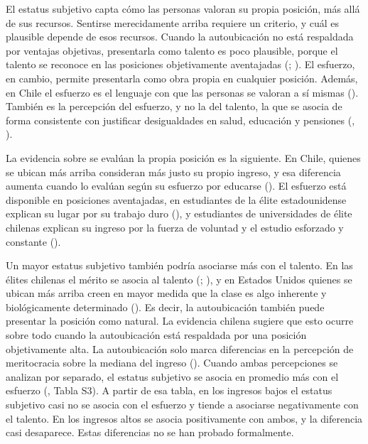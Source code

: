 \documentclass[
  spanish,
  a4paper,
  oneside]{scrbook}
\begin{document}
El estatus subjetivo capta cómo las personas valoran su propia posición,
más allá de sus recursos. Sentirse merecidamente arriba requiere un
criterio, y cuál es plausible depende de esos recursos. Cuando la
autoubicación no está respaldada por ventajas objetivas, presentarla
como talento es poco plausible, porque el talento se reconoce en las
posiciones objetivamente aventajadas
(;
).
El esfuerzo, en cambio, permite presentarla como obra propia en
cualquier posición. Además, en Chile el esfuerzo es el lenguaje con que
las personas se valoran a sí mismas
(). También es la percepción del esfuerzo, y no la del
talento, la que se asocia de forma consistente con justificar
desigualdades en salud, educación y pensiones
(,
).

La evidencia sobre se evalúan la propia posición es la siguiente. En
Chile, quienes se ubican más arriba consideran más justo su propio
ingreso, y esa diferencia aumenta cuando lo evalúan según su esfuerzo
por educarse (). El esfuerzo está disponible en posiciones
aventajadas, en estudiantes de la élite estadounidense explican su lugar
por su trabajo duro (), y estudiantes de universidades de élite chilenas explican
su ingreso por la fuerza de voluntad y el estudio esforzado y constante
().

Un mayor estatus subjetivo también podría asociarse más con el talento.
En las élites chilenas el mérito se asocia al talento
(; ), y en Estados Unidos quienes se ubican más arriba creen
en mayor medida que la clase es algo inherente y biológicamente
determinado (). Es decir, la autoubicación también puede presentar la
posición como natural. La evidencia chilena sugiere que esto ocurre
sobre todo cuando la autoubicación está respaldada por una posición
objetivamente alta. La autoubicación solo marca diferencias en la
percepción de meritocracia sobre la mediana del ingreso
(). Cuando ambas percepciones se analizan por separado, el
estatus subjetivo se asocia en promedio más con el esfuerzo
(, Tabla S3). A partir de esa tabla, en los ingresos bajos el
estatus subjetivo casi no se asocia con el esfuerzo y tiende a asociarse
negativamente con el talento. En los ingresos altos se asocia
positivamente con ambos, y la diferencia casi desaparece. Estas
diferencias no se han probado formalmente.
\end{document}
